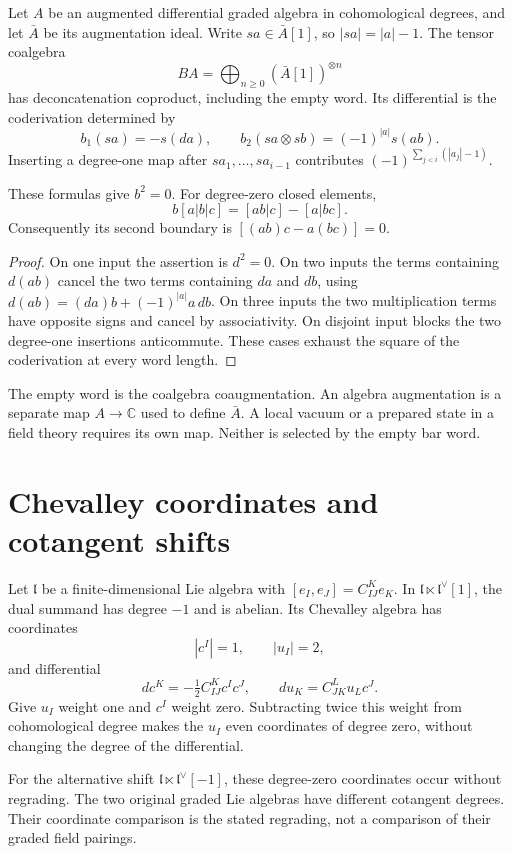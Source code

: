 Let $A$ be an augmented differential graded algebra in cohomological
degrees, and let $\bar A$ be its augmentation ideal. Write
$sa\in\bar A[1]$, so $|sa|=|a|-1$. The tensor coalgebra
\[
 BA=\bigoplus_{n\geq0}(\bar A[1])^{\otimes n}
\]
has deconcatenation coproduct, including the empty word. Its
differential is the coderivation determined by
\[
 b_1(sa)=-s(da),\qquad
 b_2(sa\otimes sb)=(-1)^{|a|}s(ab).
\]
Inserting a degree-one map after $sa_1,\ldots,sa_{i-1}$ contributes
$(-1)^{\sum_{j<i}(|a_j|-1)}$.

\begin{proposition}\label{mht:prop:suspended-bar-signs}
These formulas give $b^2=0$. For degree-zero closed elements,
\[
 b[a|b|c]=[ab|c]-[a|bc].
\]
Consequently its second boundary is $[(ab)c-a(bc)]=0$.
\end{proposition}

\begin{proof}
On one input the assertion is $d^2=0$. On two inputs the terms
containing $d(ab)$ cancel the two terms containing $da$ and $db$,
using $d(ab)=(da)b+(-1)^{|a|}a\,db$.
On three inputs the two multiplication terms have opposite signs
and cancel by associativity. On disjoint input blocks the two
degree-one insertions anticommute. These cases exhaust the square
of the coderivation at every word length.
\end{proof}

The empty word is the coalgebra coaugmentation. An algebra
augmentation is a separate map $A\to\mathbb C$ used to define
$\bar A$. A local vacuum or a prepared state in a field theory
requires its own map. Neither is selected by the empty bar word.

\section{Chevalley coordinates and cotangent shifts}

Let $\mathfrak l$ be a finite-dimensional Lie algebra with
$[e_I,e_J]=C^K_{IJ}e_K$. In
$\mathfrak l\ltimes\mathfrak l^\vee[1]$, the dual summand has
degree $-1$ and is abelian. Its Chevalley algebra has coordinates
\[
 |c^I|=1,\qquad |u_I|=2,
\]
and differential
\[
 dc^K=-\tfrac12 C^K_{IJ}c^Ic^J,
 \qquad du_K=C^L_{JK}u_Lc^J.
\]
Give $u_I$ weight one and $c^I$ weight zero. Subtracting twice this
weight from cohomological degree makes the $u_I$ even coordinates
of degree zero, without changing the degree of the differential.

For the alternative shift
$\mathfrak l\ltimes\mathfrak l^\vee[-1]$, these degree-zero
coordinates occur without regrading. The two original graded Lie
algebras have different cotangent degrees. Their coordinate
comparison is the stated regrading, not a comparison of their
graded field pairings.

